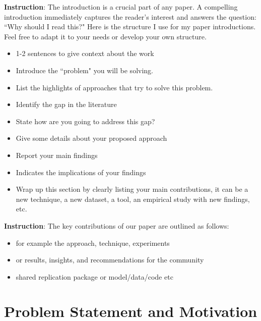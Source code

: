 \documentclass[10pt,conference]{IEEEtran}
\newcommand{\instruction}[1]{{\color{blue} \textbf{Instruction}: #1}}
\begin{document}
\instruction{The introduction is a crucial part of any paper. A compelling introduction immediately captures the reader's interest and answers the question: ``Why should I read this?" Here is the structure I use for my paper introductions. Feel free to adapt it to your needs or develop your own structure.

\begin{itemize}
    \item 1-2 sentences to give context about the work
    \item Introduce the ``problem" you will be solving.
    \item List the highlights of approaches that try to solve this problem.
    \item Identify the gap in the literature
    \item State how are you going to address this gap?
    \item Give some details about your proposed approach
    \item Report your main findings
    \item Indicates the implications of your findings
    \item Wrap up this section by clearly listing your main contributions, it can be a new technique,  a new dataset, a tool, an empirical study with new findings, etc.
\end{itemize}}

\instruction{The key contributions of our paper are outlined as follows:
\begin{itemize}
    \item for example the approach, technique, experiments
    \item or results, insights, and recommendations for the community
    \item shared replication package or model/data/code etc
\end{itemize}}
\fi
\section{Problem Statement and Motivation}
\end{document}
